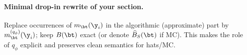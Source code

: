 \paragraph{Minimal drop-in rewrite of your section.}
Replace occurrences of \(m_\bt(\y_i)\) in the algorithmic (approximate) part by \(m_\bt^{(q_\phi)}(\y_i)\); keep \(B(\bt)\) exact (or denote \(\widehat{B}_S(\bt)\) if MC). This makes the role of \(q_\phi\) explicit and preserves clean semantics for hats/MC.